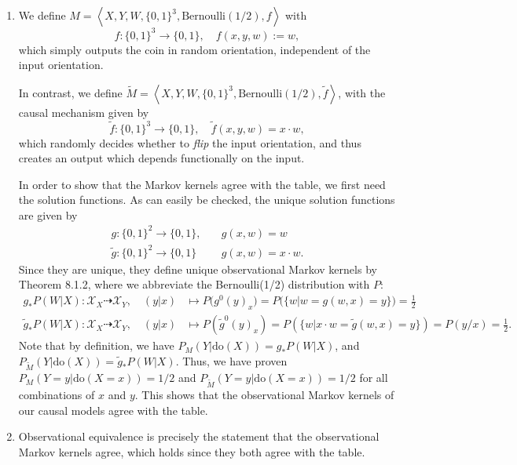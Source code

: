 \begin{enumerate}[label=12.\arabic*]
	\begin{gradedsolution}
		\begin{enumerate}
			\item {} We define $M = \left\langle X, Y, W, \{0,1\}^3, \text{Bernoulli}(1/2), f \right\rangle$ with
			\begin{equation*}
				f: \{0,1\}^3 \to \{0,1\}, \quad f(x, y, w) := w,
			\end{equation*}
			which simply outputs the coin in random orientation, independent of the input orientation.

			In contrast, we define $\tilde{M} = \left\langle X, Y, W, \{0,1\}^3, \text{Bernoulli}(1/2), \tilde{f} \right\rangle$, with the causal mechanism given by
			\begin{equation*}
				\tilde{f}: \{0,1\}^3 \to \{0,1\}, \quad \tilde{f}(x, y, w) = x \cdot w,
			\end{equation*}
			which randomly decides whether to \emph{flip} the input orientation, and thus creates an output which depends functionally on the input.

			In order to show that the Markov kernels agree with the table, we first need the solution functions.
			As can easily be checked, the unique solution functions are given by
			\begin{align*}
				g: \{0,1\}^2 \to \{0,1\},        & \quad g(x, w) = w          \\
				\tilde{g}: \{0,1\}^2 \to \{0,1\} & \quad g(x, w) = x \cdot w.
			\end{align*}
			Since they are unique, they define unique observational Markov kernels by Theorem 8.1.2, where we abbreviate the Bernoulli(1/2) distribution with $P$:
			\begin{align*}
				g_{*}P(W | X): \mathcal{X}_X \dashrightarrow \mathcal{X}_Y, \quad (y | x)         & \mapsto P\big(g^{0}(y)_x\big) = P\big(\{w | w = g(w,x) = y\}\big) = \frac{1}{2}                                                      \\
				\tilde{g}_{*}P(W | X): \mathcal{X}_X \dashrightarrow \mathcal{X}_Y, \quad (y | x) & \mapsto P\left(\tilde{g}^{0}(y)_x\right) = P\left(\{w | x \cdot w = \tilde{g}(w, x) = y \}\right) = P\left(y/x\right) = \frac{1}{2}.
			\end{align*}
			Note that by definition, we have $P_{M}(Y | \text{do}(X)) = g_{*}P(W | X)$, and $P_{\tilde{M}}(Y | \text{do}(X)) = \tilde{g}_{*}P(W | X)$.
			Thus, we have proven $P_{M}(Y = y | \text{do}(X = x)) = 1/2$ and $P_{\tilde{M}}(Y = y | \text{do}(X = x)) = 1/2$ for all combinations of $x$ and $y$.
			This shows that the observational Markov kernels of our causal models agree with the table.
			\item {} Observational equivalence is precisely the statement that the observational Markov kernels agree, which holds since they both agree with the table.


\end{enumerate}
\end{gradedsolution}
\end{enumerate}
